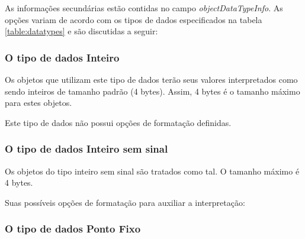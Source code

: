 \documentclass[11pt]{report}
\begin{document}
As informações secundárias estão contidas no campo \textit{objectDataTypeInfo}. As opções variam de acordo com os tipos de dados especificados na tabela \ref{table:datatypes} e são discutidas a seguir:

\subsubsection*{O tipo de dados Inteiro}

Os objetos que utilizam este tipo de dados terão seus valores interpretados como sendo inteiros de tamanho padrão (4 bytes). Assim, 4 bytes é o tamanho máximo para estes objetos.

Este tipo de dados não possui opções de formatação definidas.

\subsubsection*{O tipo de dados Inteiro sem sinal}

Os objetos do tipo inteiro sem sinal são tratados como tal. O tamanho máximo é 4 bytes.

Suas possíveis opções de formatação para auxiliar a interpretação:


\begin{table}[H]
\centering
\caption{Formatação dos objetos do tipo inteiro sem sinal}
\end{table}


\subsubsection*{O tipo de dados Ponto Fixo}
\end{document}
